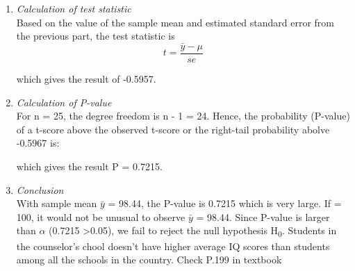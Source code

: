 \documentclass[12pt,letterpaper]{article}
\begin{document}
\begin{enumerate}
\begin{enumerate}
		\item \textit{Calculation of test statistic}\\
		Based on the value of the sample mean and estimated standard error from the previous part, the test statistic is
			$${t = \frac{\bar{y} - \mu}{\textit{se}}}$$
			
		which gives the result of -0.5957.
		
		\item \textit{Calculation of P-value}\\
		For n = 25, the degree freedom is n - 1 = 24. Hence, the probability (P-value) of a t-score above the observed t-score or the right-tail probability abolve -0.5967 is:
			 
		which gives the result P = 0.7215.
		
		\item \textit{Conclusion}\\
		With sample mean $\bar{y}$ = 98.44, the P-value is 0.7215 which is very large. If \textmu = 100, it would not be unusual to observe $\bar{y}$ = 98.44. Since P-value is larger than $\alpha$ (0.7215 \textgreater 0.05), we fail to reject the null hypothesis H\textsubscript{0}. Students in the counselor's chool doesn't have higher average IQ scores than students among all the schools in the country. Check P.199 in textbook
		
	\end{enumerate}
\end{enumerate} 
\end{document}
